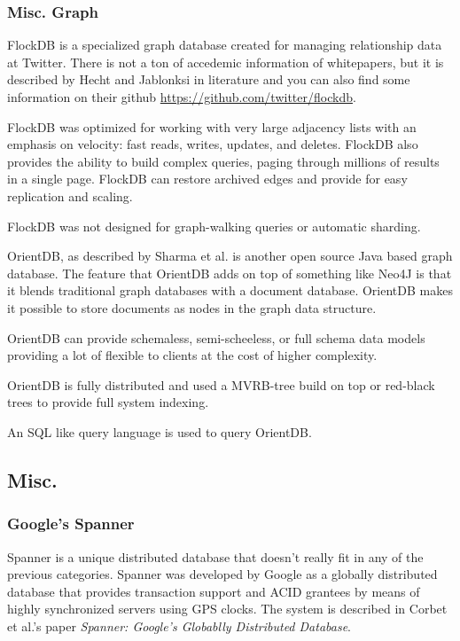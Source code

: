\documentclass[]{article}
\begin{document}
\subsubsection{Misc. Graph}
FlockDB is a specialized graph database created for managing relationship data at Twitter. There is not a ton of accedemic information of whitepapers, but it is described by Hecht and Jablonksi in literature\cite{hecht_nosql_2011} and you can also find some information on their github \url{https://github.com/twitter/flockdb}.

FlockDB was optimized for working with very large adjacency lists with an emphasis on velocity: fast reads, writes, updates, and deletes. FlockDB also provides the ability to build complex queries, paging through millions of results in a single page. FlockDB can restore archived edges and provide for easy replication and scaling. 

FlockDB was not designed for graph-walking queries or automatic sharding.

OrientDB, as described by Sharma et al.\cite{sharma_extended_2015} is another open source Java based graph database. The feature that OrientDB adds on top of something like Neo4J is that it blends traditional graph databases with a document database. OrientDB makes it possible to store documents as nodes in the graph data structure.

OrientDB can provide schemaless, semi-scheeless, or full schema data models providing a lot of flexible to clients at the cost of higher complexity.

OrientDB is fully distributed and used a MVRB-tree build on top or red-black trees to provide full system indexing.

An SQL like query language is used to query OrientDB.


\subsection{Misc.}
\subsubsection{Google's Spanner}
Spanner is a unique distributed database that doesn't really fit in any of the previous categories. Spanner was developed by Google as a globally distributed database that provides transaction support and ACID grantees by means of highly synchronized servers using GPS clocks. The system is described in Corbet et al.'s paper \textit{Spanner: Google's Globablly Distributed Database}\cite{corbett_spanner:_2013}.
\end{document}
